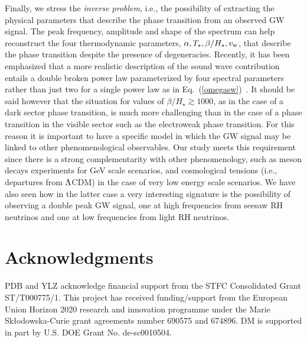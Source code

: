 \documentclass[a4paper,11pt]{article}
\begin{document}
Finally, we stress the {\it inverse problem}, i.e.,
the possibility of extracting the physical parameters that describe the phase transition from an observed GW signal. 
The peak frequency, amplitude and shape of the spectrum can help reconstruct 
the four thermodynamic parameters, $\alpha,T_\star,\beta/H_\star,v_{\rm w}$, that describe the phase transition despite the presence of degeneracies.
 Recently, it has been emphasized that a more
realistic description of the sound wave contribution entails a double broken power law
parameterized by four spectral parameters rather than just two for a single power law as in Eq.~(\ref{omegasw})~\cite{Gowling:2021gcy}.
It should be said however that the situation for values of $\beta/H_\star \gtrsim 1000$,
 as in the case of a dark sector phase transition, is much more challenging than in the case of a phase transition
 in the visible sector such as the electroweak phase transition. For this reason it is important to have a specific model
in which the GW signal may be linked to other phenomenological observables.
Our study meets this requirement since 
 there is a strong complementarity with other phenomenology, such as meson decays experiments for
GeV scale scenarios, and cosmological tensions (i.e., departures from $\Lambda$CDM) in the case of very low energy scale
scenarios. We have also seen how in the latter case a very interesting signature  is the possibility of observing a 
double peak GW signal, one at high frequencies from seesaw RH neutrinos and one at low frequencies from light RH neutrinos.
 

 


\section*{Acknowledgments} 

PDB and YLZ acknowledge financial support from the STFC Consolidated Grant ST/T000775/1. 
This project has received funding/support from the European Union Horizon 2020 research and innovation 
programme under the Marie Sk\l{}odowska-Curie grant agreements number 690575 and  674896. 
DM is supported in part by U.S. DOE Grant No. de-sc0010504.


\appendix
\renewcommand{\thesection}{\Alph{section}}
\renewcommand{\thesubsection}{\Alph{section}.\arabic{subsection}}
\def\theequation{\Alph{section}.\arabic{equation}}
\renewcommand{\thetable}{\arabic{table}}
\renewcommand{\thefigure}{\arabic{figure}}
\setcounter{section}{0}
\setcounter{equation}{0}
\end{document}
